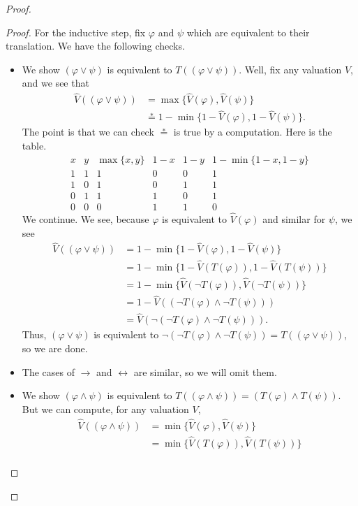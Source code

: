 \documentclass[../notes.tex]{subfiles}
\begin{document}
\begin{proof}
\begin{proof}
		For the inductive step, fix $\varphi$ and $\psi$ which are equivalent to their translation. We have the following checks.
		\begin{itemize}
			\item We show $(\varphi\lor\psi)$ is equivalent to $T((\varphi\lor\psi))$. Well, fix any valuation $V$, and we see that
			\begin{align*}
				\hat V((\varphi\lor\psi)) &= \max\{\hat V(\varphi),\hat V(\psi)\} \\
				&\stackrel*= 1-\min\{1-\hat V(\varphi),1-\hat V(\psi)\}.
			\end{align*}
			The point is that we can check $\stackrel*=$ is true by a computation. Here is the table.
			\[\begin{array}{c|c||c||c|c|c}
				x & y & \max\{x,y\} & 1-x & 1-y & 1-\min\{1-x,1-y\} \\
				\hline
				1 & 1 & 1 & 0 & 0 & 1 \\
				1 & 0 & 1 & 0 & 1 & 1 \\
				0 & 1 & 1 & 1 & 0 & 1 \\
				0 & 0 & 0 & 1 & 1 & 0
			\end{array}\]
			We continue. We see, because $\varphi$ is equivalent to $\hat V(\varphi)$ and similar for $\psi$, we see
			\begin{align*}
				\hat V((\varphi\lor\psi)) &= 1-\min\{1-\hat V(\varphi),1-\hat V(\psi)\} \\
				&= 1-\min\{1-\hat V(T(\varphi)),1-\hat V(T(\psi))\} \\
				&= 1-\min\{\hat V(\lnot T(\varphi)),\hat V(\lnot T(\psi))\} \\
				&= 1-\hat V((\lnot T(\varphi)\land\lnot T(\psi))) \\
				&= \hat V(\lnot(\lnot T(\varphi)\land\lnot T(\psi))).
			\end{align*}
			Thus, $(\varphi\lor\psi)$ is equivalent to $\lnot(\lnot T(\varphi)\land\lnot T(\psi))=T((\varphi\lor\psi))$, so we are done.
			\item The cases of $\to$ and $\leftrightarrow$ are similar, so we will omit them.
			\item We show $(\varphi\land\psi)$ is equivalent to $T((\varphi\land\psi))=(T(\varphi)\land T(\psi))$. But we can compute, for any valuation $V$,
			\begin{align*}
				\hat V((\varphi\land\psi)) &= \min\{\hat V(\varphi),\hat V(\psi)\} \\
				&= \min\{\hat V(T(\varphi)),\hat V(T(\psi))\} \\

\end{align*}
\end{itemize}
\end{proof}
\end{proof}
\end{document}
